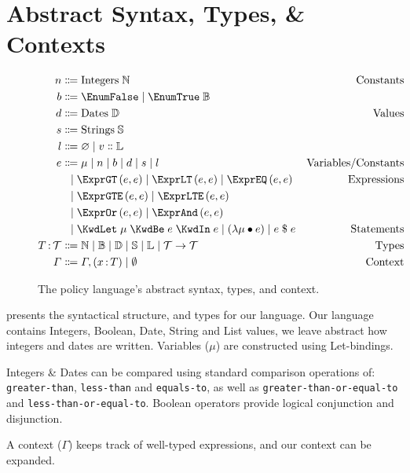 \section{Abstract Syntax, Types, \& Contexts}\label{sec:defs}

\begin{figure}[ht]
  \centering
\begin{align*}
  n
  &
    \Coloneqq
    \text{Integers} \; \mathbb{N}
  & \text{Constants}
  \\
  b
  & \Coloneqq
    \EnumFalse \alt \EnumTrue \; \mathbb{B}
  \\
  d
  & \Coloneqq
    \text{Dates} \; \mathbb{D}
  & \text{Values}
  \\
  s
  & \Coloneqq
    \text{Strings} \; \mathbb{S}
  \\
  l
  & \Coloneqq
    \varnothing \alt v \Cons \mathbb{L}
  \\
  e
  &
    \Coloneqq
    \mu
    \alt
    n
    \alt
    b
    \alt
    d
    \alt
    s
    \alt
    l
  & \text{Variables/Constants}
  \\
  &
    \firstAlt
    \exprGT{e}{e}
    \alt
    \exprLT{e}{e}
    \alt
    \exprEQ{e}{e}
  & \text{Expressions}
  \\
  & \firstAlt
    \exprGTE{e}{e}
    \alt
    \exprLTE{e}{e}
  &
  \\
  & \firstAlt
    \exprOr{e}{e}
    \alt
    \exprAnd{e}{e}
  &
  \\
  &
    \firstAlt
    \stmtLet{\mu}{e}{e}
    \alt
    \left( \lambda \mu \bullet e \right)
    \alt
    e \; \$ \; e
  &
    \text{Statements}
  \\
  \ty{T}{\mathcal{T}}
  &
    \Coloneqq
    \mathbb{N}
    \alt
    \mathbb{B}
    \alt
    \mathbb{D}
    \alt
    \mathbb{S}
    \alt
    \mathbb{L}
    \alt
    {\mathcal{T} \rightarrow{} \mathcal{T}}
  &
    \text{Types}
  \\
  \Gamma
  &
    \Coloneqq
    \envAdd{(\ty{x}{T})}
    \alt
    \emptyset
    &
      \text{Context}
\end{align*}
  \caption{\label{fig:syntax}The policy language's abstract syntax, types, and context.}
\end{figure}

 presents the syntactical structure, and types for our language.
Our language contains Integers, Boolean, Date, String and List values, we leave abstract how integers and dates are written.
Variables ($\mu$) are constructed using Let-bindings.

Integers \& Dates can be compared using standard comparison operations of: \texttt{greater-than}, \texttt{less-than} and \texttt{equals-to}, as well as \texttt{greater-than-or-equal-to} and \texttt{less-than-or-equal-to}.
Boolean operators provide logical conjunction and disjunction.

A context ($\Gamma$) keeps track of well-typed expressions, and our context can be expanded.
